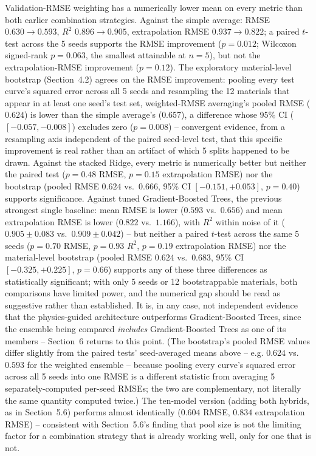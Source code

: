 \documentclass[11pt]{article}
\begin{document}
Validation-RMSE weighting has a numerically lower mean on every metric than both earlier combination strategies. Against the simple average: RMSE $0.630 \to 0.593$, $R^2$ $0.896 \to 0.905$, extrapolation RMSE $0.937 \to 0.822$; a paired $t$-test across the 5 seeds supports the RMSE improvement ($p = 0.012$; Wilcoxon signed-rank $p = 0.063$, the smallest attainable at $n=5$), but not the extrapolation-RMSE improvement ($p = 0.12$). The exploratory material-level bootstrap (Section~4.2) agrees on the RMSE improvement: pooling every test curve's squared error across all 5 seeds and resampling the 12 materials that appear in at least one seed's test set, weighted-RMSE averaging's pooled RMSE ($0.624$) is lower than the simple average's ($0.657$), a difference whose 95\% CI ($[-0.057, -0.008]$) excludes zero ($p = 0.008$) -- convergent evidence, from a resampling axis independent of the paired seed-level test, that this specific improvement is real rather than an artifact of which 5 splits happened to be drawn. Against the stacked Ridge, every metric is numerically better but neither the paired test ($p = 0.48$ RMSE, $p = 0.15$ extrapolation RMSE) nor the bootstrap (pooled RMSE $0.624$ vs.\ $0.666$, 95\% CI $[-0.151, +0.053]$, $p = 0.40$) supports significance. Against tuned Gradient-Boosted Trees, the previous strongest single baseline: mean RMSE is lower ($0.593$ vs.\ $0.656$) and mean extrapolation RMSE is lower ($0.822$ vs.\ $1.166$), with $R^2$ within noise of it ($0.905 \pm 0.083$ vs.\ $0.909 \pm 0.042$) -- but neither a paired $t$-test across the same 5 seeds ($p = 0.70$ RMSE, $p = 0.93$ $R^2$, $p = 0.19$ extrapolation RMSE) nor the material-level bootstrap (pooled RMSE $0.624$ vs.\ $0.683$, 95\% CI $[-0.325, +0.225]$, $p = 0.66$) supports any of these three differences as statistically significant; with only 5 seeds or 12 bootstrappable materials, both comparisons have limited power, and the numerical gap should be read as suggestive rather than established. It is, in any case, not independent evidence that the physics-guided architecture outperforms Gradient-Boosted Trees, since the ensemble being compared \emph{includes} Gradient-Boosted Trees as one of its members -- Section~6 returns to this point. (The bootstrap's pooled RMSE values differ slightly from the paired tests' seed-averaged means above -- e.g. $0.624$ vs.\ $0.593$ for the weighted ensemble -- because pooling every curve's squared error across all 5 seeds into one RMSE is a different statistic from averaging 5 separately-computed per-seed RMSEs; the two are complementary, not literally the same quantity computed twice.) The ten-model version (adding both hybrids, as in Section~5.6) performs almost identically ($0.604$ RMSE, $0.834$ extrapolation RMSE) -- consistent with Section~5.6's finding that pool size is not the limiting factor for a combination strategy that is already working well, only for one that is not.
\end{document}
